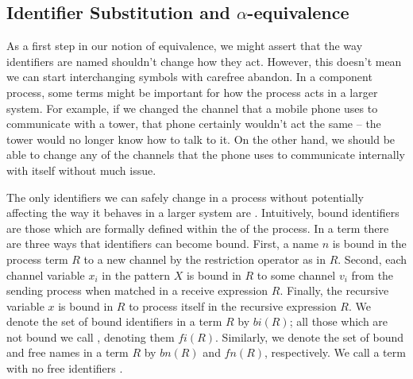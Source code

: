 \subsection{Identifier Substitution and $\alpha$-equivalence}\label{secSubst}
	As a first step in our notion of equivalence, we might assert that the way identifiers are named shouldn't change how they act.  However, this doesn't mean we can start interchanging symbols with carefree abandon.  In a component process, some terms might be important for how the process acts in a larger system.  For example, if we changed the channel that a mobile phone uses to communicate with a tower, that phone certainly wouldn't act the same -- the tower would no longer know how to talk to it.  On the other hand, we should be able to change any of the channels that the phone uses to communicate internally with itself without much issue.
	
	The only identifiers we can safely change in a process without potentially affecting the way it behaves in a larger system are .  Intuitively, bound identifiers are those which are formally defined within the of the process.  In a \picalc term there are three ways that identifiers can become bound.  First, a name $n$ is bound in the process term $R$ to a new channel by the restriction operator as in $R$.  Second, each channel variable $x_i$ in the pattern $X$ is bound in $R$ to some channel $v_i$ from the sending process when matched in a receive expression $R$.  Finally, the recursive variable $x$ is bound in $R$ to process itself in the recursive expression $R$.
	We denote the set of bound identifiers in a term $R$ by $bi(R)$; all those which are not bound we call , denoting them $fi(R)$.  Similarly, we denote the set of bound and free names in a term $R$ by $bn(R)$ and $fn(R)$, respectively.  We call a term with no free identifiers .
	
